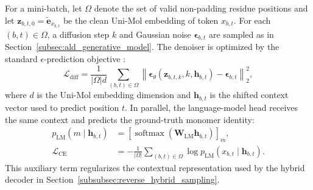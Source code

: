 \begin{methods}
For a mini-batch, let $\Omega$ denote the set of valid non-padding residue positions and let $\mathbf{z}_{b,t,0}=\tilde{\mathbf{e}}_{x_{b,t}}$ be the clean Uni-Mol embedding of token $x_{b,t}$.
For each $(b,t)\in\Omega$, a diffusion step $k$ and Gaussian noise $\boldsymbol{\epsilon}_{b,t}$ are sampled as in Section~\ref{subsec:ald_generative_model}.
The denoiser is optimized by the standard $\epsilon$-prediction objective \citep{ref_ddpm}:
\begin{equation}
\mathcal{L}_{\mathrm{diff}}
=\frac{1}{|\Omega|d}\sum_{(b,t)\in\Omega}
\left\|
\boldsymbol{\epsilon}_{\theta}(\mathbf{z}_{b,t,k}, k, \mathbf{h}_{b,t})
-\boldsymbol{\epsilon}_{b,t}
\right\|_2^2 ,
\label{eq:diff_loss}
\end{equation}
where $d$ is the Uni-Mol embedding dimension and $\mathbf{h}_{b,t}$ is the shifted context vector used to predict position $t$.
In parallel, the language-model head receives the same context and predicts the ground-truth monomer identity:
\begin{equation}
\begin{aligned}
p_{\mathrm{LM}}(m\mid \mathbf{h}_{b,t})
&=\left[\operatorname{softmax}(\mathbf{W}_{\mathrm{LM}}\mathbf{h}_{b,t})\right]_m,\\
\mathcal{L}_{\mathrm{CE}}
&=-\frac{1}{|\Omega|}\sum_{(b,t)\in\Omega}
\log p_{\mathrm{LM}}(x_{b,t}\mid \mathbf{h}_{b,t}).
\end{aligned}
\label{eq:ce_loss}
\end{equation}
This auxiliary term regularizes the contextual representation used by the hybrid decoder in Section~\ref{subsubsec:reverse_hybrid_sampling}.


\end{methods}
